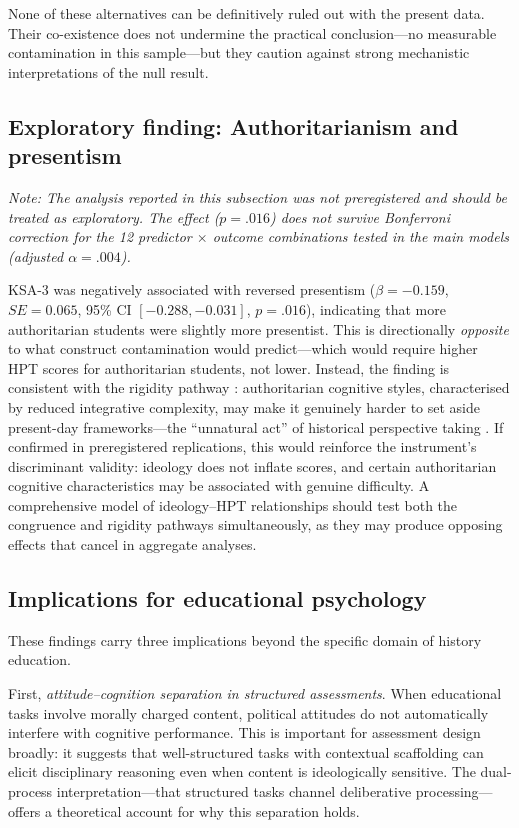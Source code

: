 \documentclass[pdflatex,sn-apa]{sn-jnl}%
\begin{document}
None of these alternatives can be definitively ruled out with the present data. Their co-existence does not undermine the practical conclusion---no measurable contamination in this sample---but they caution against strong mechanistic interpretations of the null result.

\subsection{Exploratory finding: Authoritarianism and presentism}\label{subsec:exploratory}

\emph{Note: The analysis reported in this subsection was not preregistered and should be treated as exploratory. The effect ($p = .016$) does not survive Bonferroni correction for the 12 predictor $\times$ outcome combinations tested in the main models (adjusted $\alpha = .004$).}

KSA-3 was negatively associated with reversed presentism ($\beta = -0.159$, $SE = 0.065$, 95\% CI $[-0.288, -0.031]$, $p = .016$), indicating that more authoritarian students were slightly more presentist. This is directionally \emph{opposite} to what construct contamination would predict---which would require higher HPT scores for authoritarian students, not lower. Instead, the finding is consistent with the rigidity pathway \citep{Duckitt2001, Suedfeld1977}: authoritarian cognitive styles, characterised by reduced integrative complexity, may make it genuinely harder to set aside present-day frameworks---the ``unnatural act'' of historical perspective taking \citep{Wineburg2001}. If confirmed in preregistered replications, this would reinforce the instrument's discriminant validity: ideology does not inflate scores, and certain authoritarian cognitive characteristics may be associated with genuine difficulty. A comprehensive model of ideology--HPT relationships should test both the congruence and rigidity pathways simultaneously, as they may produce opposing effects that cancel in aggregate analyses.

\subsection{Implications for educational psychology}\label{subsec:implications_edpsych}

These findings carry three implications beyond the specific domain of history education.

First, \emph{attitude--cognition separation in structured assessments}. When educational tasks involve morally charged content, political attitudes do not automatically interfere with cognitive performance. This is important for assessment design broadly: it suggests that well-structured tasks with contextual scaffolding can elicit disciplinary reasoning even when content is ideologically sensitive. The dual-process interpretation---that structured tasks channel deliberative processing---offers a theoretical account for why this separation holds.
\end{document}
